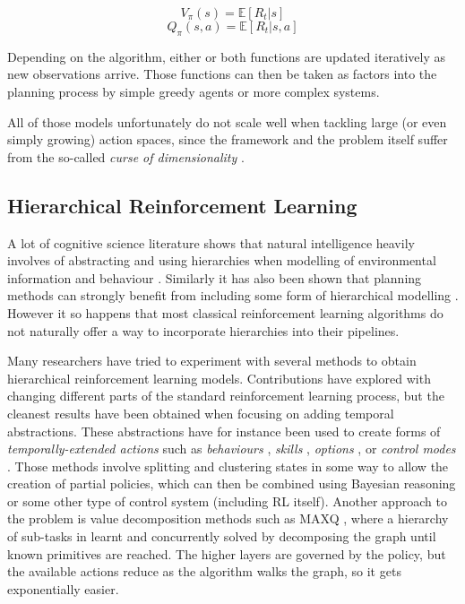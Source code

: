 \begin{equation}
V_{\pi}(s) = \mathbb{E}[R_t | s]
\label{eq:value}
\end{equation}
\begin{equation}
Q_{\pi}(s, a) = \mathbb{E}[R_t | s, a]
\label{eq:q_act}
\end{equation}

Depending on the algorithm, either or both functions are updated iteratively as
new observations arrive. Those functions can then be taken as factors into the
planning process by simple greedy agents or more complex systems.


All of those models unfortunately do not scale well when tackling large (or even
simply growing) action spaces, since the framework and the problem itself suffer
from the so-called \emph{curse of dimensionality} \citep{bellman1957dynamic}.

\subsection{Hierarchical Reinforcement Learning}

A lot of cognitive science literature shows that natural intelligence heavily
involves of abstracting and using hierarchies when modelling of environmental
information and behaviour \citep{gentner2014mental, byrne1989spatial,
  colunga2005lexicon}. Similarly it has also been shown that planning methods
can strongly benefit from including some form of hierarchical modelling
\citep{knoblock1994automatically}. However it so happens that most classical
reinforcement learning algorithms do not naturally offer a way to incorporate
hierarchies into their pipelines.

Many researchers have tried to experiment with several methods to obtain
hierarchical reinforcement learning models. Contributions have explored with
changing different parts of the standard reinforcement learning process, but the
cleanest results have been obtained when focusing on adding temporal
abstractions. These abstractions have for instance been used to create forms of
\emph{temporally-extended actions} such as \emph{behaviours}
\citep{brooks1986achieving}, \emph{skills} \citep{thrun1995finding},
\emph{options} \citep{sutton1999between}, or \emph{control modes}
\citep{grudic2000localizing}. Those methods involve splitting and clustering
states in some way to allow the creation of partial policies, which can then be
combined using Bayesian reasoning or some other type of control system
(including RL itself).
Another approach to the problem is value decomposition methods such as MAXQ
\citep{dietterich2000hierarchical}, where a hierarchy of sub-tasks in learnt and
concurrently solved by decomposing the graph until known primitives are reached.
The higher layers are governed by the policy, but the available actions reduce
as the algorithm walks the graph, so it gets exponentially easier.

